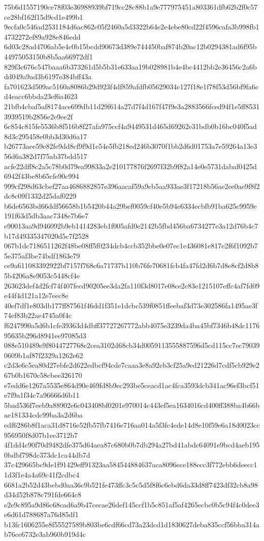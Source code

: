 {75b6d1557190ce78f03e36988939bf719cc28c88b1a9e777975451a803361dfb62b2f0c57ce28bf162f15d9cd1e499b1
9ecfa0c546ad2531184d6ac862c05f2460a5d3322b64e2e4ebe80cd22f4596cafa3b998fb14732272ef89a928e846edd
6d03c28ad4706ab5e4c0b15bcdd90673d389e744450baf874b20ac12b0294381ad6f95b44975053150b8b5aa66972df1
829f3c676c547baaa6b373261d5b5b31e633aa19b028981b4e4bc4412bb2e36456c2a6bdd049a9ad3b6197e384bff43a
fa701623d509ac5160a8086b29d923f4df859afdfb05629034c127f18e1f78f53d56bf9fa6cd4eacc6bbda23ef6a4623
21bfb4cbaf5af8174ace699db11d29f614a27d7f4d167f47f9e3a2883566fced94f1e5ff85313939519b2856e2e9ee2f
6c854c815fe5536b8f516b8f27afa975ccf4a9449531d465d69262e31bdb0b16bc040f5ad8d3c295458e0bb3d30d6a17
b26773aee59e82fe9dd8cf9f9d1e54e5fb218ed246b3070f1bb2d6d01753a7e59264a13e356d6a382d7f75ab37bdd517
acfe22dff8c2a5c78b0d79ea99833a2e210177876f2697f32b9f82a14e0e5731dabaf0425d6942f43be8b65cfe90c994
999cf298d63cbef27aa4686882857e396aacaf59a9cb5aa933ae3f17218b56ae2ee0ae9f8f2dc8c09f1332d25daf0229
b6de6563bd66ddf56658b1b5420b44a29bef0059cf40e5b94e6334ecbfb91ba625c9959e191f63d5db3aac7348e7b6e7
e90013aa9d946092b9eb1414283eb1f005afd0e2142b5fbd456ba6734277e3a12d76b4c7b17d49335347020d5c7f2528
067b1dc7186511262f48be08ff5f0234dcb4ccb352bbe0e07ec1e436081e817e2f6f1092b75e375af3be74bdf1863e79
ce9a611083392922bf7157f768c6a71737b110b76fe70681fcb4fa47fd2d6b7d8e8cf2d8b85b4206a8e9053c5448cf4e
263623def4d2fcf74f407fecd90205ee3da2fa110f3d8017e08ce2c83e1215107effc4af7fd09e44f4d121a12e7eec8e
40ef7df1e803db177ff87561f46dd1f351e1dcbc539f0851ffeebaf3d73e302586fa1495ae3f74ef83b22ae4745a0f4c
f6247990a5d6b1cfe39363d4dbff37727267772abb4075e3239da4ba45bf7346b48dc117695635b296d8941ee97085d3
088e510489e9f8044727768e2cea3102d68cb34d0059113555887596d5cd115cc7ec790390609b1af87f2329a1262e62
c2d3e6c5ea80d27ebfe2d622edbcf94cde7caaa3e8a92eb3cf25a9ed21226d7cdf5cb929e267b0b1670c58cbee326170
e7edd6e1267a5535e864d90e469fd8b9ec293be5ceacd1ac4fca3593dcb341ac96ef3bcf51e7f9a1f34c7a96666d6b11
5bad536f7eeb9a88902e6c043408bf0201e970014c443ef5ea1634016cd400ff388ba4b66bae181334cdc99ba3a2d6ba
edf6286b8f1aca31d8716e52fb57fb7416e716aa014a5f3fc4ede14d8e10f59e6a18d0023cc956950f8d07b1ee3712b7
4f1dd4c90f70d9482dfe375d64aea87c680b0b7db294a27bd41abdc64091e9bcd4aeb1950bdbf798dc373dc1ca44db7d
37c429665bc9de1f91429eff91323aa584544884637aca8096ece188ecc3f772ebb6deecc11d3f1e4a4a69c41f2cdbc4
6681a2b52d43bebd0aa36c9b521fe473ffc3c5c5d5f8f6c6ebd6da33d8ff7423df32cb8a98d34d52b878c791fde664c8
e2e9c895a9d86c68cad6a9b47cecae26def145ccf1b5c851af5af4265ecbc0b5c94f4c0dee3e6d61d788687a76d85df1
b13fc1606255e8f55527589b803be6cdf66cd73a23dcd1d1830627deba835ccf56bba314ab76ce6732e3ab960b919d4c
}
